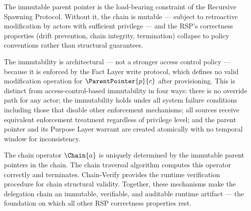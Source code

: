 The immutable parent pointer is the load-bearing constraint of the Recursive Spawning Protocol. Without it, the chain is mutable --- subject to retroactive modification by actors with sufficient privilege --- and the RSP's correctness properties (drift prevention, chain integrity, termination) collapse to policy conventions rather than structural guarantees.

The immutability is architectural --- not a stronger access control policy --- because it is enforced by the Fact Layer write protocol, which defines no valid modification operation for $\ParentPointer{p}{c}$ after provisioning. This is distinct from access-control-based immutability in four ways: there is no override path for any actor; the immutability holds under all system failure conditions including those that disable other enforcement mechanisms; all sources receive equivalent enforcement treatment regardless of privilege level; and the parent pointer and its Purpose Layer warrant are created atomically with no temporal window for inconsistency.

The chain operator $\Chain{a}$ is uniquely determined by the immutable parent pointers in the chain. The chain traversal algorithm computes this operator correctly and terminates. Chain-Verify provides the runtime verification procedure for chain structural validity. Together, these mechanisms make the delegation chain an immutable, verifiable, and auditable runtime artifact --- the foundation on which all other RSP correctness properties rest.